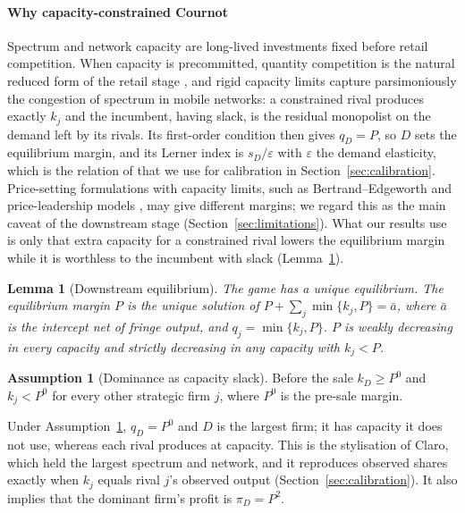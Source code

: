 \documentclass[12pt,a4paper]{article}
\newtheorem{lemma}{Lemma}
\theoremstyle{definition}
\newtheorem{assumption}{Assumption}
\theoremstyle{remark}
\begin{document}
\paragraph{Why capacity-constrained Cournot} Spectrum and network capacity are long-lived investments fixed before retail competition. When capacity is precommitted, quantity competition is the natural reduced form of the retail stage \citep{krepsscheinkman1983}, and rigid capacity limits capture parsimoniously the congestion of spectrum in mobile networks: a constrained rival produces exactly $k_j$ and the incumbent, having slack, is the residual monopolist on the demand left by its rivals. Its first-order condition then gives $q_D=P$, so $D$ sets the equilibrium margin, and its Lerner index is $s_D/\varepsilon$ with $\varepsilon$ the demand elasticity, which is the relation of \citet{cowlingwaterson1976} that we use for calibration in Section~\ref{sec:calibration}. Price-setting formulations with capacity limits, such as Bertrand--Edgeworth and price-leadership models \citep{deneckerekovenock1992}, may give different margins; we regard this as the main caveat of the downstream stage (Section~\ref{sec:limitations}). What our results use is only that extra capacity for a constrained rival lowers the equilibrium margin while it is worthless to the incumbent with slack (Lemma~\ref{lem:cournot}).

\begin{lemma}[Downstream equilibrium]\label{lem:cournot}
The game has a unique equilibrium. The equilibrium margin $P$ is the unique solution of $P+\sum_j\min\{k_j,P\}=\bar a$, where $\bar a$ is the intercept net of fringe output, and $q_j=\min\{k_j,P\}$. $P$ is weakly decreasing in every capacity and strictly decreasing in any capacity with $k_j<P$.
\end{lemma}

\begin{assumption}[Dominance as capacity slack]\label{ass:dominance}
Before the sale $k_D\ge P^0$ and $k_j<P^0$ for every other strategic firm $j$, where $P^0$ is the pre-sale margin.
\end{assumption}

Under Assumption~\ref{ass:dominance}, $q_D=P^0$ and $D$ is the largest firm; it has capacity it does not use, whereas each rival produces at capacity. This is the stylisation of Claro, which held the largest spectrum and network, and it reproduces observed shares exactly when $k_j$ equals rival $j$'s observed output (Section~\ref{sec:calibration}). It also implies that the dominant firm's profit is $\pi_D=P^2$.
\end{document}

